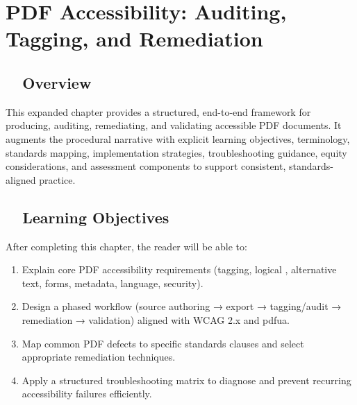 \chapter{PDF Accessibility: Auditing, Tagging, and Remediation}


\section{~~Overview}\label{ch18:sec:overview}
This expanded chapter provides a structured, end-to-end framework for producing, auditing, remediating, and validating accessible PDF documents. It augments the procedural narrative with explicit learning objectives, terminology, standards mapping, implementation strategies, troubleshooting guidance, equity considerations, and assessment components to support consistent, standards-aligned practice.

\section{~~Learning Objectives}\label{ch18:sec:learning-objectives}
After completing this chapter, the reader will be able to:
\begin{enumerate}
	\item Explain core PDF accessibility requirements (tagging, logical , alternative text, forms, metadata, language, security).
	\item Design a phased workflow (source authoring → export → tagging/audit → remediation → validation) aligned with WCAG 2.x and \gls{pdfua}.
	\item Map common PDF defects to specific standards clauses and select appropriate remediation techniques.
	\item Apply a structured troubleshooting matrix to diagnose and prevent recurring accessibility failures efficiently.
\end{enumerate}

